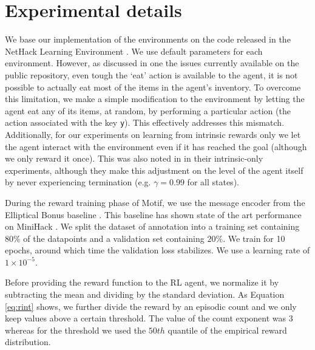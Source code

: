 \documentclass{article} %
\begin{document}
\section{Experimental details} \label{appendix:experimental-details}

We base our implementation of the environments on the code released in the NetHack Learning Environment \citep{KuttlerNMRSGR20}. We use default parameters for each environment.
However, as discussed in one the issues currently available on the public repository, even tough the `eat' action is available to the agent, it is not possible to actually eat most of the items in the agent's inventory. To overcome this limitation, we make a simple modification to the environment by letting the agent eat any of its items, at random, by performing a particular action (the action associated with the key \texttt{y}). 
This effectively addresses this mismatch. Additionally, for our experiments on learning from intrinsic rewards only we let the agent interact with the environment even if it has reached the goal (although we only reward it once). This was also noted in \citep{burda2018exploration} in their intrinsic-only experiments, although they make this adjustment on the level of the agent itself by never experiencing termination (e.g. $\gamma = 0.99$ for all states). 

During the reward training phase of Motif, we use the message encoder from the Elliptical Bonus baseline \citep{HenaffRJR22}. This baseline has shown state of the art performance on MiniHack \citep{Samvelyan2021}. We split the dataset of annotation into a training set containing $80\%$ of the datapoints and a validation set containing $20\%$. We train for 10 epochs, around which time the validation loss stabilizes. We use a learning rate of $1 \times 10^{-5}$. 

Before providing the reward function to the RL agent, we normalize it by subtracting the mean and dividing by the standard deviation. As Equation \ref{eq:rint} shows, we further divide the reward by an episodic count and we only keep values above a certain threshold. The value of the count exponent was $3$ whereas for the threshold we used the $50th$ quantile of the empirical reward distribution.
\end{document}

